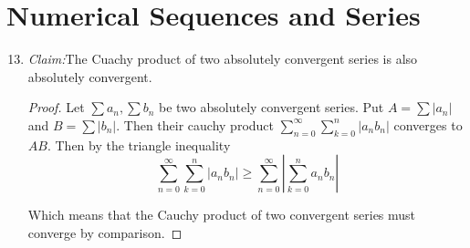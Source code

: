 \documentclass{article}
\begin{document}
\newcommand{\R}{\mathbb{R}}
\newcommand{\claim}{\par\noindent\textit{Claim:}\space}

\setcounter{section}{2}
\section{Numerical Sequences and Series}

\begin{enumerate}
\setcounter{enumi}{12}
\item \claim The Cuachy product of two absolutely convergent series is also
      absolutely convergent.

\begin{proof}
Let $\sum a_n, \sum b_n$ be two absolutely convergent series. Put
$A = \sum |a_n|$ and $B = \sum |b_n|$. Then their cauchy product
$\sum_{n=0}^{\infty} \sum_{k=0}^n |a_n b_n|$ converges to $AB$. Then by the
triangle inequality
\begin{equation*}
\sum_{n=0}^{\infty} \sum_{k=0}^n | a_n b_n | \geq
\sum_{n=0}^{\infty} | \sum_{k=0}^n a_n b_n |
\end{equation*}

Which means that the Cauchy product of two convergent series must converge by
comparison.
\end{proof} \end{enumerate}
\end{document}
